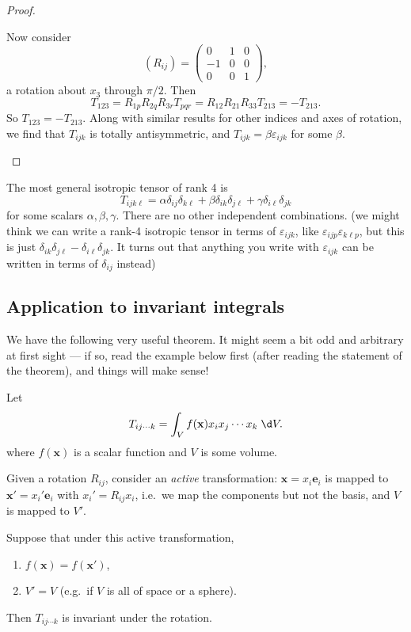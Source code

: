 \documentclass[a4paper]{article}
\begin{document}
\begin{proof}
\begin{enumerate}
      Now consider
      \[
        (R_{ij}) =
        \begin{pmatrix}
          0 & 1 & 0\\
          -1 & 0 & 0\\
          0 & 0 & 1
        \end{pmatrix},
      \]
      a rotation about $x_3$ through $\pi/2$. Then
      \[
        T_{123} = R_{1p}R_{2q}R_{3r}T_{pqr} = R_{12}R_{21}R_{33}T_{213} =-T_{213}.
      \]
      So $T_{123} = -T_{213}$. Along with similar results for other indices and axes of rotation, we find that $T_{ijk}$ is totally antisymmetric, and $T_{ijk} = \beta \varepsilon_{ijk}$ for some $\beta$.\qedhere
  \end{enumerate}
\end{proof}
\begin{eg}
  The most general isotropic tensor of rank 4 is
  \[
    T_{ijk\ell} = \alpha \delta_{ij}\delta_{k\ell} + \beta \delta_{ik}\delta_{j\ell} + \gamma \delta_{i\ell}\delta_{jk}
  \]
  for some scalars $\alpha, \beta, \gamma$. There are no other independent combinations. (we might think we can write a rank-4 isotropic tensor in terms of $\varepsilon_{ijk}$, like $\varepsilon_{ijp}\varepsilon_{k\ell p}$, but this is just $\delta_{ik}\delta_{j\ell} - \delta_{i\ell}\delta_{jk}$. It turns out that anything you write with $\varepsilon_{ijk}$ can be written in terms of $\delta_{ij}$ instead)
\end{eg}

\subsection{Application to invariant integrals}
We have the following very useful theorem. It might seem a bit odd and arbitrary at first sight --- if so, read the example below first (after reading the statement of the theorem), and things will make sense!
\begin{thm}
  Let
  \[
    T_{ij\cdots k} = \int_V f(\mathbf{x}) x_i x_j \cdots x_k\;\d V.
  \]
  where $f(\mathbf{x})$ is a scalar function and $V$ is some volume.

  Given a rotation $R_{ij}$, consider an \emph{active} transformation: $\mathbf{x} = x_i \mathbf{e}_i$ is mapped to $\mathbf{x}' = x_i' \mathbf{e}_i$ with $x_i' = R_{ij} x_i$, i.e.\ we map the components but not the basis, and $V$ is mapped to $V'$.

  Suppose that under this active transformation,
  \begin{enumerate}
    \item $f(\mathbf{x}) = f(\mathbf{x}')$,
    \item $V' = V$ (e.g.\ if $V$ is all of space or a sphere).
  \end{enumerate}
  Then $T_{ij\cdots k}$ is invariant under the rotation.
\end{thm}
\end{document}
